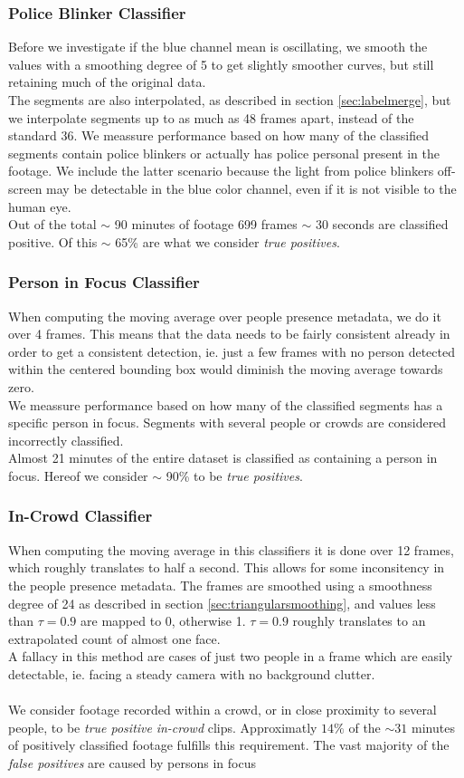 \subsubsection{Police Blinker Classifier}
%
Before we investigate if the blue channel mean is oscillating, we smooth the values with a smoothing degree of 5 to get slightly smoother curves, but still retaining much of the original data.\\
The segments are also interpolated, as described in section \ref{sec:labelmerge}, but we interpolate segments up to as much as 48 frames apart, instead of the standard 36.
%
We meassure performance based on how many of the classified segments contain police blinkers or actually has police personal present in the footage. We include the latter scenario because the light from police blinkers off-screen may be detectable in the blue color channel, even if it is not visible to the human eye.\\
Out of the total $\sim$ 90 minutes of footage 699 frames $\sim$ 30 seconds are classified positive. Of this $\sim$ 65\% are what we consider \textit{true positives}.
%
\subsubsection{Person in Focus Classifier}
%
When computing the moving average over people presence metadata, we do it over 4 frames. This means that the data needs to be fairly consistent already in order to get a consistent detection, ie. just a few frames with no person detected within the centered bounding box would diminish the moving average towards zero.\\
%
We meassure performance based on how many of the classified segments has a specific person in focus. Segments with several people or crowds are considered incorrectly classified.\\
Almost 21 minutes of the entire dataset is classified as containing a person in focus. Hereof we consider $\sim$ 90\% to be \textit{true positives}.
%
\subsubsection{In-Crowd Classifier}\label{sec:peformanceforincrowdclassifier}
%
When computing the moving average in this classifiers it is done over 12 frames, which roughly translates to half a second. This allows for some inconsitency in the people presence metadata. The frames are smoothed using a smoothness degree of 24 as described in section \ref{sec:triangularsmoothing}, and values less than $\tau=0.9$ are mapped to 0, otherwise 1. $\tau=0.9$ roughly translates to an extrapolated count of almost one face.\\
%
A fallacy in this method are cases of just two people in a frame which are easily detectable, ie. facing a steady camera with no background clutter.\\
\\
We consider footage recorded within a crowd, or in close proximity to several people, to be \textit{true positive} \textit{in-crowd} clips. Approximatly $14\%$ of the $\sim 31$ minutes of positively classified footage fulfills this requirement. The vast majority of the \textit{false positives} are caused by persons in focus
%
